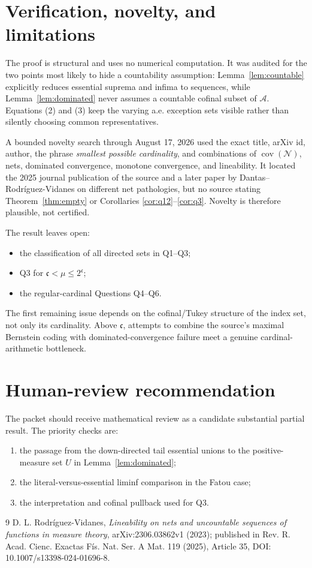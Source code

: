 \documentclass[11pt]{article}
\theoremstyle{remark}
\newcommand{\covN}{\operatorname{cov}(\mathcal N)}
\newcommand{\finc}{\mathfrak c}
\begin{document}
\section{Verification, novelty, and limitations}

The proof is structural and uses no numerical computation.  It was audited
for the two points most likely to hide a countability assumption:
Lemma~\ref{lem:countable} explicitly reduces essential suprema and infima to
sequences, while Lemma~\ref{lem:dominated} never assumes a countable cofinal
subset of \(\mathcal A\).  Equations (2) and (3) keep the varying a.e.
exception sets visible rather than silently choosing common
representatives.

A bounded novelty search through August 17, 2026 used the exact title,
arXiv id, author, the phrase \emph{smallest possible cardinality}, and
combinations of \(\covN\), nets, dominated convergence, monotone convergence,
and lineability.  It located the 2025 journal publication of the source and
a later paper by Dantas--Rodr\'iguez-Vidanes on different net pathologies,
but no source stating Theorem~\ref{thm:empty} or Corollaries
\ref{cor:q12}--\ref{cor:q3}.  Novelty is therefore plausible, not certified.

The result leaves open:
\begin{itemize}[leftmargin=*]
\item the classification of all directed sets in Q1--Q3;
\item Q3 for \(\finc<\mu\le2^{\finc}\);
\item the regular-cardinal Questions Q4--Q6.
\end{itemize}
The first remaining issue depends on the cofinal/Tukey structure of the
index set, not only its cardinality.  Above \(\finc\), attempts to combine
the source's maximal Bernstein coding with dominated-convergence failure
meet a genuine cardinal-arithmetic bottleneck.

\section{Human-review recommendation}

The packet should receive mathematical review as a candidate substantial
partial result.  The priority checks are:
\begin{enumerate}[leftmargin=*]
\item the passage from the down-directed tail essential unions to the
positive-measure set \(U\) in Lemma~\ref{lem:dominated};
\item the literal-versus-essential liminf comparison in the Fatou case;
\item the interpretation and cofinal pullback used for Q3.
\end{enumerate}

\begin{thebibliography}{9}
D. L. Rodr\'iguez-Vidanes,
\emph{Lineability on nets and uncountable sequences of functions in measure
theory},
arXiv:2306.03862v1 (2023); published in
Rev. R. Acad. Cienc. Exactas F\'is. Nat. Ser. A Mat. 119 (2025), Article 35,
DOI: 10.1007/s13398-024-01696-8.
\end{thebibliography}
\end{document}

